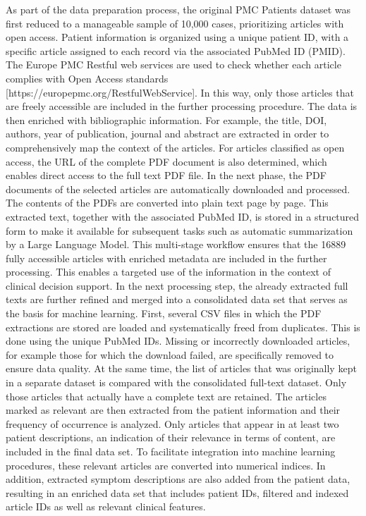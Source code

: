 As part of the data preparation process, the original PMC Patients dataset was first reduced to a manageable sample of 10,000 cases, prioritizing articles with open access. Patient information is organized using a unique patient ID, with a specific article assigned to each record via the associated PubMed ID (PMID). The Europe PMC Restful web services are used to check whether each article complies with Open Access standards [https://europepmc.org/RestfulWebService]. In this way, only those articles that are freely accessible are included in the further processing procedure. The data is then enriched with bibliographic information. For example, the title, DOI, authors, year of publication, journal and abstract are extracted in order to comprehensively map the context of the articles. For articles classified as open access, the URL of the complete PDF document is also determined, which enables direct access to the full text PDF file. In the next phase, the PDF documents of the selected articles are automatically downloaded and processed. The contents of the PDFs are converted into plain text page by page. This extracted text, together with the associated PubMed ID, is stored in a structured form to make it available for subsequent tasks such as automatic summarization by a Large Language Model. This multi-stage workflow ensures that the 16889 fully accessible articles with enriched metadata are included in the further processing. This enables a targeted use of the information in the context of clinical decision support.
In the next processing step, the already extracted full texts are further refined and merged into a consolidated data set that serves as the basis for machine learning. First, several CSV files in which the PDF extractions are stored are loaded and systematically freed from duplicates. This is done using the unique PubMed IDs. Missing or incorrectly downloaded articles, for example those for which the download failed, are specifically removed to ensure data quality. At the same time, the list of articles that was originally kept in a separate dataset is compared with the consolidated full-text dataset. Only those articles that actually have a complete text are retained. The articles marked as relevant are then extracted from the patient information and their frequency of occurrence is analyzed. Only articles that appear in at least two patient descriptions, an indication of their relevance in terms of content, are included in the final data set. To facilitate integration into machine learning procedures, these relevant articles are converted into numerical indices. In addition, extracted symptom descriptions are also added from the patient data, resulting in an enriched data set that includes patient IDs, filtered and indexed article IDs as well as relevant clinical features. 

